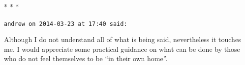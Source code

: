 
\begin{center}* * *\end{center}

\begin{footnotesize}
\begin{sffamily}
\texttt{andrew on 2014-03-23 at 17:40 said:}

Although I do not understand all of what is being said, nevertheless it touches me. I would appreciate some practical guidance on what can be done by those who do not feel themselves to be ``in their own home''.

\end{sffamily}
\end{footnotesize}

